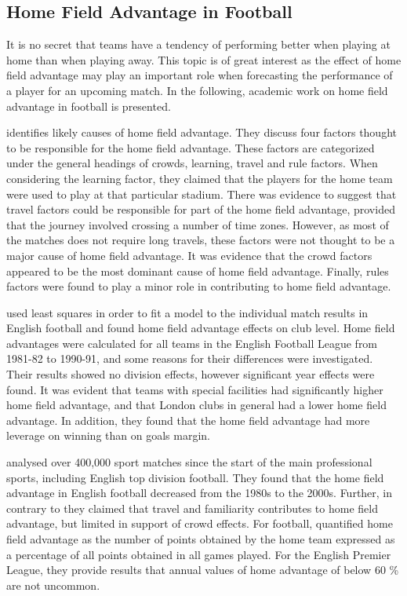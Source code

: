 \subsection{Home Field Advantage in Football}\label{HomeFieldAdvantage}
It is no secret that teams have a tendency of performing better when playing at home than when playing away. This topic is of great interest as the effect of home field advantage may play an important role when forecasting the performance of a player for an upcoming match. In the following, academic work on home field advantage in football is presented.

\newpar

\cite{Nevill} identifies likely causes of home field advantage. They discuss four factors thought to be responsible for the home field advantage. These factors are categorized under the general headings of crowds, learning, travel and rule factors. When considering the learning factor, they claimed that the players for the home team were used to play at that particular stadium. There was evidence to suggest that travel factors could be responsible for part of the home field advantage, provided that the journey involved crossing a number of time zones. However, as most of the matches does not require long travels, these factors were not thought to be a major cause of home field advantage. It was evidence that the crowd factors appeared to be the most dominant cause of home field advantage. Finally, rules factors were found to play a minor role in contributing to home field advantage. 

\newpar

\cite{Clarke} used least squares in order to fit a model to the individual match results in English football and found home field advantage effects on club level. Home field advantages were calculated for all teams in the English Football League from 1981-82 to 1990-91, and some reasons for their differences were investigated. Their results showed no division effects, however significant year effects were found. It was evident that teams with special facilities had significantly higher home field advantage, and that London clubs in general had a lower home field advantage. In addition, they found that the home field advantage had more leverage on winning than on goals margin. 

\newpar

\cite{Pollard} analysed over 400,000 sport matches since the start of the main professional sports, including English top division football. They found that the home field advantage in English football decreased from the 1980s to the 2000s. Further, in contrary to \cite{Nevill} they claimed that travel and familiarity contributes to home field advantage, but limited in support of crowd effects. For football, \citep{Pollard} quantified home field advantage as the number of points obtained by the home team expressed as a percentage of all points obtained in all games played. For the English Premier League, they provide results that annual values of home advantage of below 60 \% are not uncommon. 


